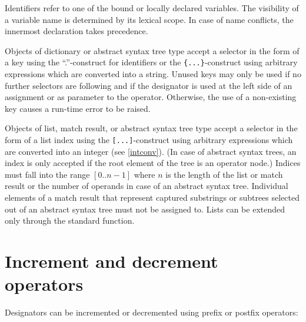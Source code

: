 \noindent
Identifiers refer to one of the bound or locally declared variables.
The visibility of a variable name is determined by its lexical scope.
In case of name conflicts, the innermost declaration takes precedence.

Objects of dictionary or abstract syntax
tree type accept a selector in the form
of a key using the ``.''-construct for identifiers or the
\lstinline!{...}!-construct using arbitrary expressions which are
converted into a string. Unused keys may only be used if no further
selectors are following and if the designator is used at the left side
of an assignment or as parameter to the  operator.
Otherwise, the use of a non-existing key causes a run-time error to be
raised.

Objects of list, match result,
or abstract syntax tree type
accept a selector in the form of a list index using the
\lstinline![...]!-construct using arbitrary expressions which are
converted into an integer (see \ref{intconv}).
(In case of abstract syntax trees,
an index is only accepted if the root element of the tree is
an operator node.) Indices must fall into the range $[0..n-1]$
where $n$ is the length of the list or match result or the number
of operands in case of an abstract syntax tree. Individual
elements of a match result that represent captured substrings or
subtrees selected out of an abstract syntax tree must
not be assigned to. Lists can be extended only through the
 standard function.

\section{Increment and decrement operators}

Designators can be incremented or decremented using prefix
or postfix operators:

\begin{grammar}
      \produces \lextoken{++}  \\
      \produces \lextoken{$-${}$-$}  \\
      \produces {} \lextoken{++} \\
      \produces {} \lextoken{$-${}$-$}
\end{grammar}

